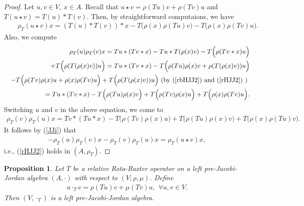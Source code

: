 \documentclass[12pt]{amsart}
\newtheorem{proposition}[Theorem]{Proposition}
\begin{document}
\begin{proof}
	Let $u,v\in V,\ x\in A.$ Recall that $u\star v=\rho(Tu)v+\rho(Tv)u$ and $T(u\star v)=T(u)\ast T(v).$ Then, by  straightforward  computaions, we have
	\begin{eqnarray}
		&&\rho_T(u\star v)x=(T(u)\ast T(v))\ast x-T\Big(\rho(x)\rho(Tu)v\Big)-T\Big(\rho(x)\rho(Tv)u\Big).\nonumber
	\end{eqnarray}
	Also, we compute
	\begin{eqnarray}
		&&\rho_T(u)\rho_T(v)x=Tu\ast(Tv\ast x)-Tu\ast T(\rho(x)v)-
		T\Big(\rho(Tv\ast x )u\Big)\nonumber\\
		&&+T\Big( \rho(T(\rho(x)v))u\Big)=
		Tu\ast(Tv\ast x)-T\Big(\rho(Tu)\rho(x)v+\rho(T(\rho(x)v))u \Big)\nonumber\\
		&&-
		T\Big(\rho(T v)\rho(x)u+\rho(x)\rho(Tv)u \Big)+T\Big( \rho(T(\rho(x)v))u\Big)
		\mbox{ (by (\ref{rbHJJ2}) and (\ref{rHJJ2})  ) }\nonumber\\
		&&=
		T u\ast(Tv\ast x)-T\Big(\rho(T u)\rho(x)v\Big)+
		T\Big(\rho(T v)\rho(x)u\Big)+T\Big(\rho(x)\rho(Tv)u \Big).\nonumber
	\end{eqnarray}
	Switching $u$ and $v$ in the above equation, we come to
	\begin{eqnarray}
		\rho_T(v)\rho_T(u)x=
		Tv\ast(Tu\ast x)-T\Big(\rho(T v)\rho(x)u\Big)+
		T\Big(\rho(T u)\rho(x)v\Big)+T\Big(\rho(x)\rho(Tu)v \Big).\nonumber
	\end{eqnarray}
	It follows by (\ref{JJi}) that
	\begin{eqnarray}
		-\rho_T(u)\rho_T(v)x-\rho_T(v)\rho_T(u)x=\rho_T(u\star v)x,\nonumber
	\end{eqnarray}
	i.e., (\ref{rHJJ2}) holds in $(A,\rho_T).$
\end{proof}	
\begin{proposition}	
	\label{l1}
	Let $ T $ be a relative Rota-Baxter operator on a left pre-Jacobi-Jordan algebra $ (A,\cdot) $ with respect to $ (V; \rho,\mu) $. Define
	\begin{eqnarray}
		\label{15}
		u \cdot _{T} v=\rho(Tu)v+\mu(Tv)u,\,\  \forall u,v\in V.
	\end{eqnarray}
	Then $ (V,\cdot _{T} ) $ is a left pre-Jacobi-Jordan algebra.
\end{proposition}	
\end{document}

